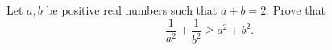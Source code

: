 Let $a,b$ be positive real numbers such that $a + b = 2$. Prove that \[
\dfrac{1}{a^2} + \dfrac{1}{b^2} \ge a^2+b^2.
\]
